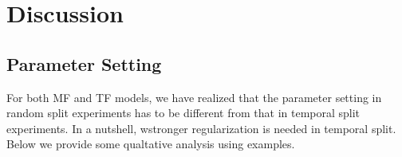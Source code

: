 \section{Discussion}  \label{sec:disc}



\subsection{Parameter Setting} \label{subsec:parameter}

For both MF and TF models, we have realized that the parameter setting in random split experiments has to be different from that in temporal split experiments. In a nutshell, wstronger regularization is needed in temporal split. Below we provide some qualtative analysis using examples. 

